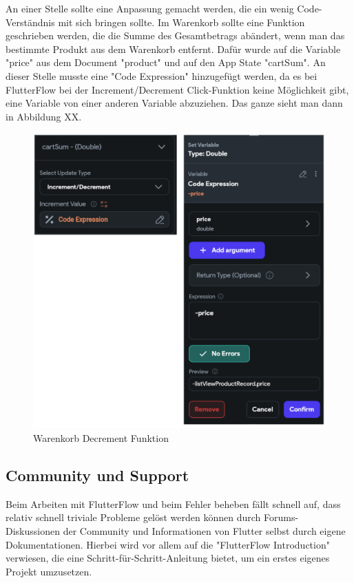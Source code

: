 \documentclass[acmtog, language=ngerman]{acmart}
\begin{document}
An einer Stelle sollte eine Anpassung gemacht werden, die ein wenig Code-Verständnis mit sich bringen sollte.
Im Warenkorb sollte eine Funktion geschrieben werden, die die Summe des Gesamtbetrags abändert, wenn man das bestimmte Produkt aus dem Warenkorb entfernt. Dafür wurde auf die Variable "price" aus dem Document "product" und auf den App State "cartSum". An dieser Stelle musste eine "Code Expression" hinzugefügt werden, da es bei FlutterFlow bei der Increment/Decrement Click-Funktion keine Möglichkeit gibt, eine Variable von einer anderen Variable abzuziehen. Das ganze sieht man dann in Abbildung XX.
\begin{figure}[h]
    \centering
    \includegraphics[width=1\linewidth]{images/FF_decrement.png}
    \caption{Warenkorb Decrement Funktion}
    \label{fig:enter-label}
\end{figure}
\subsection{Community und Support}
Beim Arbeiten mit FlutterFlow und beim Fehler beheben fällt schnell auf, dass relativ schnell triviale Probleme gelöst werden können durch Forums-Diskussionen der Community und Informationen von Flutter selbst durch eigene Dokumentationen. Hierbei wird vor allem auf die "FlutterFlow Introduction" verwiesen, die eine Schritt-für-Schritt-Anleitung bietet, um ein erstes eigenes Projekt umzusetzen.
\end{document}
